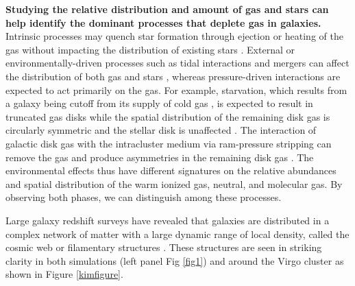 \documentclass[11pt, preprint]{aastex}
\begin{document}
{\bf Studying the relative distribution
and amount of gas and stars can help identify the dominant processes
that deplete gas in galaxies. }
Intrinsic processes may quench star formation through
ejection or heating of the gas without impacting the distribution of
existing stars \citep[e.g.][]{springel05,
  croton06, dekel06}.  External or environmentally-driven processes 
such as tidal interactions and
mergers can
affect the distribution of both gas and stars \citep{springel05,
  croton06, dekel06}, whereas pressure-driven interactions are expected to
act primarily on the gas.  For example, starvation, which results from
a galaxy being cutoff from its supply of cold gas \citep{Larson80}, is
expected to result in
truncated gas disks while the spatial distribution of the
remaining disk gas is circularly symmetric and the stellar disk is unaffected \citep[e.g.][]{kawata08}. 
The interaction of galactic disk gas with the intracluster medium via
ram-pressure stripping can remove the gas and produce asymmetries in
the remaining disk gas \citep[e.g.][]{quilis00,crowl05}.  
{The environmental effects thus
have different signatures on the relative abundances and spatial
distribution of the warm ionized gas, neutral, and molecular gas.  By
observing both 
phases, we can distinguish among these processes.}
 

Large galaxy redshift surveys have revealed that galaxies are distributed in a complex network
of matter with a large dynamic range of local density, called the
cosmic web or filamentary structures \citep{kitaura09, darvish14}.
These structures are seen in striking clarity in both simulations
(left panel Fig \ref{fig1}) and around the
Virgo cluster as shown in Figure \ref{kimfigure}.  
\end{document}

